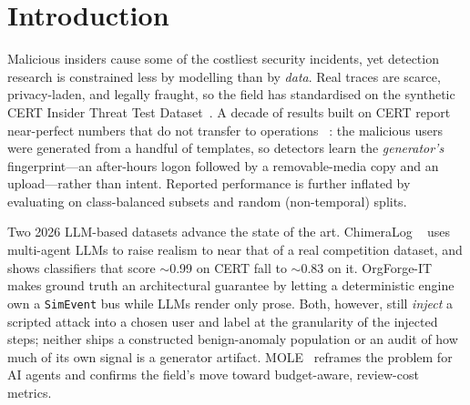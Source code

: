 \documentclass[11pt]{article}
\newcommand{\code}[1]{\texttt{\small #1}}
\begin{document}
\section{Introduction}
Malicious insiders cause some of the costliest security incidents, yet detection
research is constrained less by modelling than by \emph{data}. Real traces are scarce,
privacy-laden, and legally fraught, so the field has standardised on the synthetic
CERT Insider Threat Test Dataset~\citep{glasser2013bridging}. A decade of results built
on CERT report near-perfect numbers that do not transfer to operations
~\citep{jurisic2026decade}: the malicious users were generated from a handful of
templates, so detectors learn the \emph{generator's} fingerprint---an after-hours
logon followed by a removable-media copy and an upload---rather than intent. Reported
performance is further inflated by evaluating on class-balanced subsets and random
(non-temporal) splits.

Two 2026 LLM-based datasets advance the state of the art. ChimeraLog
~\citep{yu2026chimera} uses multi-agent LLMs to raise realism to near that of a real
competition dataset, and shows classifiers that score $\sim$0.99 on CERT fall to
$\sim$0.83 on it. OrgForge-IT~\citep{orgforgeit2026} makes ground truth an
architectural guarantee by letting a deterministic engine own a \code{SimEvent} bus
while LLMs render only prose. Both, however, still \emph{inject} a scripted attack
into a chosen user and label at the granularity of the injected steps; neither ships a
constructed benign-anomaly population or an audit of how much of its own signal is a
generator artifact. MOLE~\citep{mole2026} reframes the problem for AI agents and
confirms the field's move toward budget-aware, review-cost metrics.
\end{document}
